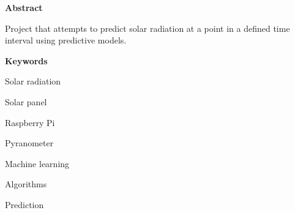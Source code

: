 
\newpage

\thispagestyle{empty}

\begin{center}

{\bf \Huge Abstract}

  \end{center}
\vspace{1cm}

Project that attempts to predict solar radiation at a point in a defined time interval using predictive models.

\vspace{1cm}

\begin{center}

{\bf \Large Keywords}
\vspace{1cm}

   Solar radiation
   \vspace{0.5cm}

   Solar panel
   \vspace{0.5cm}

   Raspberry Pi
   \vspace{0.5cm}

   Pyranometer
   \vspace{0.5cm}

   Machine learning
   \vspace{0.5cm}

   Algorithms
   \vspace{0.5cm}

   Prediction
   \vspace{0.5cm}

   \end{center}

   \vspace{0.5cm}
   


